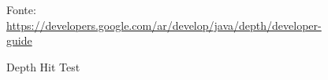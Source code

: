 \documentclass[crop=false, class=book]{standalone}
\begin{document}
		\begin{figure}
			\centering
			{Fonte: \url{https://developers.google.com/ar/develop/java/depth/developer-guide}}
			\caption{Depth Hit Test}
			\label{fig: Depth Hit Test}
		\end{figure}
\end{document}
